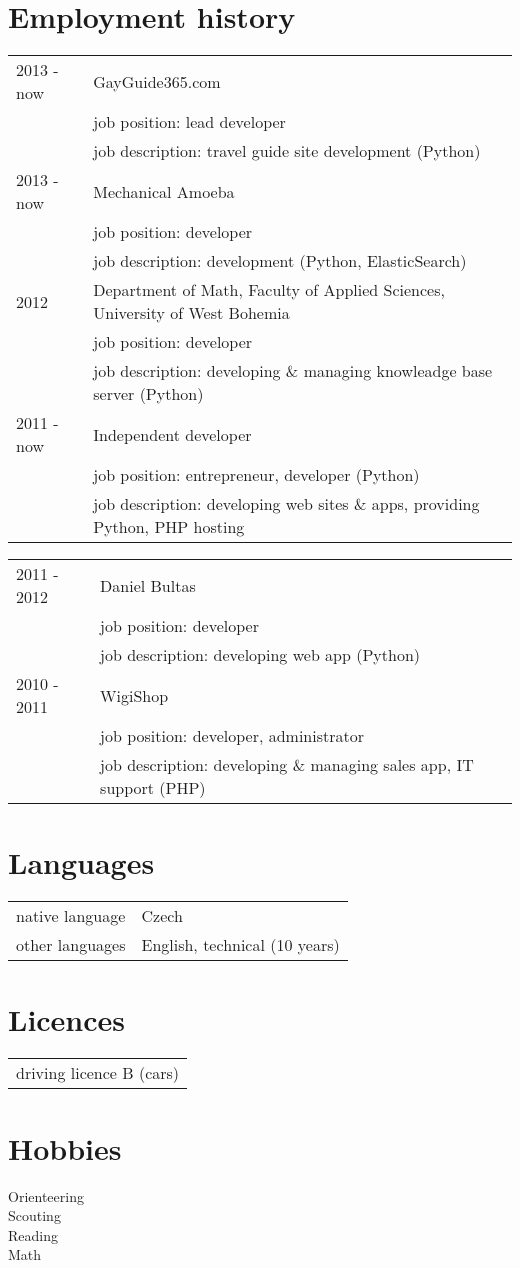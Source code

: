 \documentclass[12pt,a4paper]{article}
\begin{document}
\section*{Employment history}
\begin{tabular}{@{}p{2cm}l}
2013 - now & GayGuide365.com\\
 & job position: lead developer\\
 & job description: travel guide site development (Python)\\
2013 - now & Mechanical Amoeba\\
 & job position: developer\\
 & job description: development (Python, ElasticSearch)\\
2012 & Department of Math, Faculty of Applied Sciences, University of West Bohemia \\
 & job position: developer\\
 & job description: developing \& managing knowleadge base server (Python)\\
2011 - now & Independent developer \\
 & job position: entrepreneur, developer (Python)\\
 & job description: developing web sites \& apps, providing Python, PHP hosting\\
\end{tabular}

\begin{tabular}{@{}p{2cm}ll}
2011 - 2012 & Daniel Bultas\\
 & job position: developer\\
 & job description: developing web app (Python)\\
2010 - 2011 & WigiShop\\
 & job position: developer, administrator\\
 & job description: developing \& managing sales app, IT support (PHP)\\
\end{tabular}

\section*{Languages}
\begin{tabular}{@{}p{4cm}l}
native language & Czech\\
other languages & English, technical (10 years)\\
\end{tabular}

\section*{Licences}
\begin{tabular}{@{}l}
driving licence  B (cars)\\
\end{tabular}

\section*{Hobbies}
Orienteering\\
Scouting\\
Reading\\
Math\\
\end{document}
